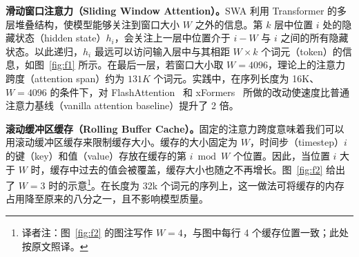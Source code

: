 \documentclass[a4paper,11pt]{article}
\providecommand{\bipar}[2]{#2}
\begin{document}
\bipar{\textbf{Sliding Window Attention.} SWA exploits the stacked layers of a transformer to attend information beyond the window size $W$. The hidden state in position $i$ of the layer $k$, $h_i$, attends to all hidden states from the previous layer with positions between $i - W$ and $i$. Recursively, $h_i$ can access tokens from the input layer at a distance of up to $W \times k$ tokens, as illustrated in Figure~\ref{fig:f1}. At the last layer, using a window size of $W = 4096$, we have a theoretical attention span of approximately $131K$ tokens. In practice, for a sequence length of 16K and $W = 4096$, changes made to FlashAttention \cite{ref11} and xFormers \cite{ref18} yield a 2x speed improvement over a vanilla attention baseline.}{\textbf{滑动窗口注意力（Sliding Window Attention）。}SWA 利用 Transformer 的多层堆叠结构，使模型能够关注到窗口大小 $W$ 之外的信息。第 $k$ 层中位置 $i$ 处的隐藏状态（hidden state）$h_i$，会关注上一层中位置介于 $i-W$ 与 $i$ 之间的所有隐藏状态。以此递归，$h_i$ 最远可以访问输入层中与其相距 $W\times k$ 个词元（token）的信息，如图~\ref{fig:f1} 所示。在最后一层，若窗口大小取 $W=4096$，理论上的注意力跨度（attention span）约为 $131K$ 个词元。实践中，在序列长度为 16K、$W=4096$ 的条件下，对 FlashAttention~\cite{ref11} 和 xFormers~\cite{ref18} 所做的改动使速度比普通注意力基线（vanilla attention baseline）提升了 2 倍。}

\bipar{\textbf{Rolling Buffer Cache.} A fixed attention span means that we can limit our cache size using a rolling buffer cache. The cache has a fixed size of $W$, and the keys and values for the timestep $i$ are stored in position $i \bmod W$ of the cache. As a result, when the position $i$ is larger than $W$, past values in the cache are overwritten, and the size of the cache stops increasing. We provide an illustration in Figure~\ref{fig:f2} for $W = 3$. On a sequence length of 32k tokens, this reduces the cache memory usage by 8x, without impacting the model quality.}{\textbf{滚动缓冲区缓存（Rolling Buffer Cache）。}固定的注意力跨度意味着我们可以用滚动缓冲区缓存来限制缓存大小。缓存的大小固定为 $W$，时间步（timestep）$i$ 的键（key）和值（value）存放在缓存的第 $i \bmod W$ 个位置。因此，当位置 $i$ 大于 $W$ 时，缓存中过去的值会被覆盖，缓存大小也随之不再增长。图~\ref{fig:f2} 给出了 $W=3$ 时的示意\footnote{译者注：图~\ref{fig:f2} 的图注写作 $W=4$，与图中每行 4 个缓存位置一致；此处按原文照译。}。在长度为 32k 个词元的序列上，这一做法可将缓存的内存占用降至原来的八分之一，且不影响模型质量。}
\end{document}
